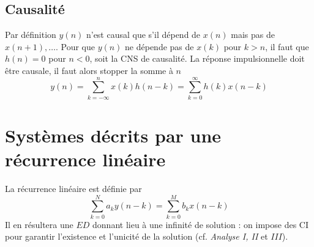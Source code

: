 	\subsection{Causalité}
	Par définition $y(n)$ n'est causal que s'il dépend de $x(n)$ mais pas de $x(n+1),\dots$. 
	Pour que $y(n)$ ne dépende pas de $x(k)$ pour $k>n$, il faut que $h(n)=0$ pour $n<0$, 
	soit la CNS de causalité. La réponse impulsionnelle doit être causale, il faut alors 
	stopper la somme à $n$
	\begin{equation}
	y(n) = \sum_{k=-\infty}^n x(k)h(n-k) = \sum_{k=0}^\infty h(k)x(n-k)
	\end{equation}
	
\section{Systèmes décrits par une récurrence linéaire}
La récurrence linéaire est définie par
\begin{equation}
\sum_{k=0}^N a_ky(n-k) = \sum_{k=0}^M b_kx(n-k)
\end{equation}
Il en résultera une $ED$ donnant lieu à une infinité de solution : on impose des CI pour 
garantir l'existence et l'unicité de la solution (cf. \textit{Analyse I, II} et $III$).

